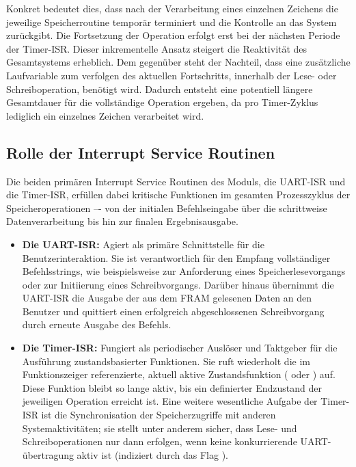 Konkret bedeutet dies, dass nach der Verarbeitung eines einzelnen Zeichens die jeweilige Speicherroutine tempor\"ar terminiert und die Kontrolle an das System zur\"uckgibt. Die Fortsetzung der Operation erfolgt erst bei der n\"achsten Periode der Timer-ISR. Dieser inkrementelle Ansatz steigert die Reaktivit\"at des Gesamtsystems erheblich. Dem gegen\"uber steht der Nachteil, dass eine zus\"atzliche Laufvariable zum verfolgen des aktuellen Fortschritts, innerhalb der Lese- oder Schreiboperation, ben\"otigt wird. Dadurch entsteht eine potentiell l\"angere Gesamtdauer f\"ur die vollst\"andige Operation ergeben, da pro Timer-Zyklus lediglich ein einzelnes Zeichen verarbeitet wird.\AI

\subsection{Rolle der Interrupt Service Routinen}
\label{LesenSchreiben_Rolle_ISR}

Die beiden prim\"aren Interrupt Service Routinen des Moduls, die UART-ISR und die Timer-ISR, erf\"ullen dabei kritische Funktionen im gesamten Prozesszyklus der Speicheroperationen –- von der initialen Befehlseingabe \"uber die schrittweise Datenverarbeitung bis hin zur finalen Ergebnisausgabe.

\begin{itemize}
	\item \textbf{Die UART-ISR:} Agiert als prim\"are Schnittstelle f\"ur die Benutzerinteraktion. Sie ist verantwortlich f\"ur den Empfang vollst\"andiger Befehlsstrings, wie beispielsweise  zur Anforderung eines Speicherlesevorgangs oder  zur Initiierung eines Schreibvorgangs. Dar\"uber hinaus \"ubernimmt die UART-ISR die Ausgabe der aus dem FRAM gelesenen Daten an den Benutzer und quittiert einen erfolgreich abgeschlossenen Schreibvorgang durch erneute Ausgabe des Befehls.
	
	\item \textbf{Die Timer-ISR:} Fungiert als periodischer Ausl\"oser und Taktgeber f\"ur die Ausf\"uhrung zustandsbasierter Funktionen. Sie ruft wiederholt die im Funktionszeiger  referenzierte, aktuell aktive Zustandsfunktion (\zB {} oder ) auf. Diese Funktion bleibt so lange aktiv, bis ein definierter Endzustand der jeweiligen Operation erreicht ist. Eine weitere wesentliche Aufgabe der Timer-ISR ist die Synchronisation der Speicherzugriffe mit anderen Systemaktivit\"aten; sie stellt unter anderem sicher, dass Lese- und Schreiboperationen nur dann erfolgen, wenn keine konkurrierende UART-\"ubertragung aktiv ist (indiziert durch das Flag ).
	
\end{itemize}

